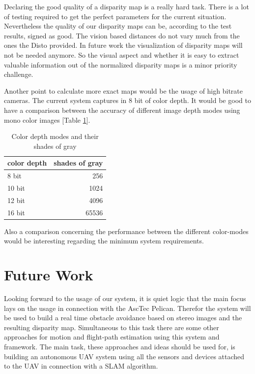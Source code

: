 \documentclass[11pt]{article}
\begin{document}
Declaring the good quality of a disparity map is a really hard task. There is a lot of testing required to get the perfect parameters for the current situation. Nevertheless the quality of our disparity maps can be, according to the test results, signed as good. The vision based distances do not vary much from the ones the Disto provided. In future work the visualization of disparity maps will not be needed anymore. So the visual aspect and whether it is easy to extract valuable information out of the normalized disparity maps is a minor priority challenge.

Another point to calculate more exact maps would be the usage of high bitrate cameras. The current system captures in 8 bit of color depth. It would be good to have a comparison between the accuracy of different image depth modes using mono color images [Table \ref{table:colormodes}].
\begin{table}[htbp]
	\begin{center}
	\begin{tabular}{|l|r|}
	\hline
	color depth  & \multicolumn{1}{l|}{shades of gray} \\ \hline
	8 bit & 256 \\ \hline
	10 bit & 1024 \\ \hline
	12 bit & 4096 \\ \hline
	16 bit & 65536 \\ \hline
	\end{tabular}
	\end{center}
	\caption{Color depth modes and their shades of gray}
	\label{table:colormodes}
\end{table}

Also a comparison concerning the performance between the different color-modes would be interesting regarding the minimum system requirements.

\section{Future Work}
Looking forward to the usage of our system, it is quiet logic that the main focus lays on the usage in connection with the AscTec Pelican. Therefor the system will be used to build a real time obstacle avoidance based on stereo images and the resulting disparity map. Simultaneous to this task there are some other approaches for motion and flight-path estimation using this system and framework. The main task, these approaches and ideas should be used for, is building an autonomous UAV system using all the sensors and devices attached to the UAV in connection with a SLAM algorithm.
\end{document}
